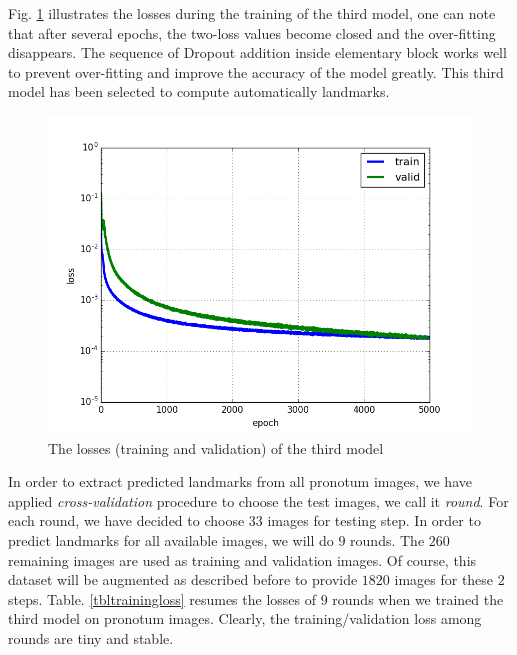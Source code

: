 \documentclass[review]{elsarticle}
\begin{document}
Fig. \ref{figloss3} illustrates the losses during the training of the third model, one can note that after several epochs, the two-loss values become closed and the over-fitting disappears.  The sequence of Dropout addition inside elementary block works well to prevent over-fitting and improve the accuracy of the model greatly. This third model has been selected to compute automatically landmarks.

\begin{figure}[htbp]
    \centering
    \includegraphics[scale=0.35]{images/model3_loss}
    \caption{The losses (training and validation) of the third model}
    \label{figloss3}
\end{figure}

In order to extract predicted landmarks from all pronotum images, we have applied \textit{cross-validation} procedure to choose the test images, we call it \textit{round}. For each round, we have decided to choose $33$ images for testing step. In order to predict landmarks for all available images, we will do $9$ rounds. The $260$ remaining images are used as training and validation images. Of course, this dataset will be augmented as described before to provide $1820$ images for these $2$ steps. Table. \ref{tbltrainingloss} resumes the losses of $9$ rounds when we trained the third model on pronotum images. Clearly, the training/validation loss among rounds are tiny and stable.
\end{document}
